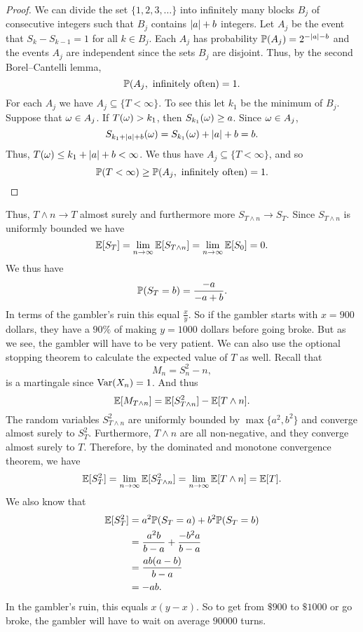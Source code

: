 \begin{proof}
    We can divide the set $\{1,2,3,\ldots\}$ into infinitely many blocks $B_j$ of consecutive integers such that $B_j$ contains ${\left\lvert a\right\rvert}+b$ integers. Let $A_j$ be the event that $S_k-S_{k-1} = 1$ for all $k \in B_j$. Each $A_j$ has probability ${\mathbb{P}}(A_j) = 2^{-{\left\lvert a\right\rvert}-b}$ and the events $A_j$ are independent since the sets $B_j$ are disjoint. Thus, by the second Borel--Cantelli lemma,
    \[{\mathbb{P}}(A_j, \text{ infinitely often}) =1. \]
    For each $A_j$ we have $A_j \subseteq \{T < \infty\}.$ To see this let $k_1$ be the minimum of $B_j$. Suppose that ${\omega} \in A_j$. If $T({\omega}) > k_1$, then $S_{k_1}({\omega}) \ge a$. Since ${\omega} \in A_j$, 
    \[S_{k_1+{\left\lvert a\right\rvert}+b}({\omega}) = S_{k_1}({\omega}) + {\left\lvert a\right\rvert}+b = b.\] 
    Thus, $T({\omega}) \le k_1+{\left\lvert a\right\rvert}+b < \infty$. We thus have $A_j \subseteq \{T < \infty\}$, and so
     \[{\mathbb{P}}(T < \infty)\ge {\mathbb{P}}(A_j, \text{ infinitely often})=1.\] 
\end{proof}
Thus, $T\land n \to T$ almost surely and furthermore more $S_{T\land n} \to S_T$. Since $S_{T\land n}$ is uniformly bounded we have
\[{\mathbb{E}}[S_T] =\lim_{n \to \infty} {\mathbb{E}}[S_{T\land n}] = \lim_{n\to \infty}{\mathbb{E}}[S_0] =0. \]
We thus have 
\[{\mathbb{P}}(S_T = b) = \frac{-a}{-a+b}. \]
In terms of the gambler's ruin this equal $\frac{x}{y}$. So if the gambler starts with $x=900$ dollars, they have a $90\%$ of making $y=1000$ dollars before going broke. But as we see, the gambler will have to be very patient. We can also use the optional stopping theorem to calculate the expected value of $T$ as well. Recall that 
\[M_n = S_n^2 - n,\]
is a martingale since $\operatorname{Var}(X_n)=1$. And thus 
\[{\mathbb{E}}[M_{T \land n}] = {\mathbb{E}}[S_{T \land n}^2] - {\mathbb{E}}[T \land n]. \]
The random variables $S_{T \land n}^2$ are uniformly bounded by $\max\{a^2,b^2\}$ and converge almost surely to $S_T^2$. Furthermore, $T \land n$ are all non-negative, and they converge almost surely to $T$. Therefore, by the dominated and monotone convergence theorem, we have
\[{\mathbb{E}}[S_{T}^2] = \lim_{n \to \infty} {\mathbb{E}}[S_{T \land n}^2] = \lim_{n \to \infty}{\mathbb{E}}[T\land n] = {\mathbb{E}}[T]. \]
We also know that
\begin{align*}
    {\mathbb{E}}[S_T^2]&=a^2{\mathbb{P}}(S_T = a) + b^2{\mathbb{P}}(S_T = b)\\
    &=\frac{a^2b}{b-a} + \frac{-b^2a}{b-a}\\
    &= \frac{ab(a-b)}{b-a}\\
    &=-ab.
\end{align*}
In the gambler's ruin, this equals $x(y-x)$. So to get from $\$900$ to $\$1000$ or go broke, the gambler will have to wait on average $90000$ turns.
